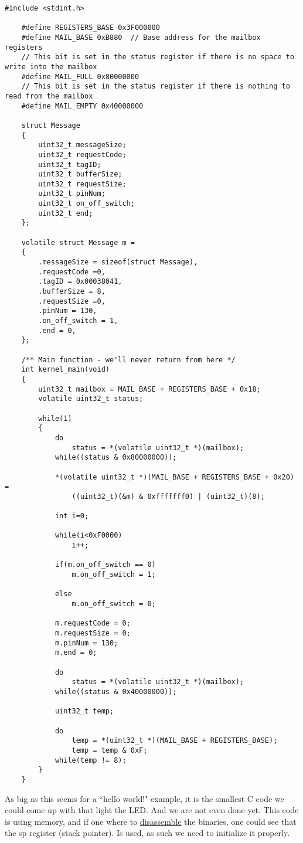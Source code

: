 \documentclass[12pt]{book}
\begin{document}
\lstset{language=C}
\begin{lstlisting}[style=C]
	#include <stdint.h>
	
	#define REGISTERS_BASE 0x3F000000
	#define MAIL_BASE 0xB880  // Base address for the mailbox registers
	// This bit is set in the status register if there is no space to write into the mailbox
	#define MAIL_FULL 0x80000000
	// This bit is set in the status register if there is nothing to read from the mailbox
	#define MAIL_EMPTY 0x40000000
	
	struct Message
	{
		uint32_t messageSize;
		uint32_t requestCode;
		uint32_t tagID;
		uint32_t bufferSize;
		uint32_t requestSize;
		uint32_t pinNum;
		uint32_t on_off_switch;
		uint32_t end;
	};
	
	volatile struct Message m =
	{
		.messageSize = sizeof(struct Message),
		.requestCode =0,
		.tagID = 0x00038041,
		.bufferSize = 8,
		.requestSize =0,
		.pinNum = 130,
		.on_off_switch = 1,
		.end = 0,
	};
	
	/** Main function - we'll never return from here */
	int kernel_main(void)
	{
		uint32_t mailbox = MAIL_BASE + REGISTERS_BASE + 0x18;
		volatile uint32_t status;
		
		while(1)
		{
			do
				status = *(volatile uint32_t *)(mailbox);
			while((status & 0x80000000));
			
			*(volatile uint32_t *)(MAIL_BASE + REGISTERS_BASE + 0x20) = 
				((uint32_t)(&m) & 0xfffffff0) | (uint32_t)(8);
			
			int i=0;
			
			while(i<0xF0000)
				i++;
			
			if(m.on_off_switch == 0)
				m.on_off_switch = 1;
			
			else
				m.on_off_switch = 0;
			
			m.requestCode = 0;
			m.requestSize = 0;
			m.pinNum = 130;
			m.end = 0;
			
			do
				status = *(volatile uint32_t *)(mailbox);
			while((status & 0x40000000));
			
			uint32_t temp;
			
			do
				temp = *(uint32_t *)(MAIL_BASE + REGISTERS_BASE);
				temp = temp & 0xF;
			while(temp != 8);
		}
	}
\end{lstlisting}


As big as this seems for a ``hello world!" example, it is the smallest C code we could come up with that light the LED. And we are not even done yet. This code is using memory, and if one where to \hyperlink{dissassemble}{disassemble} the binaries, one could see that the sp register (stack pointer). Is used, as such we need to initialize it properly.
\end{document}
